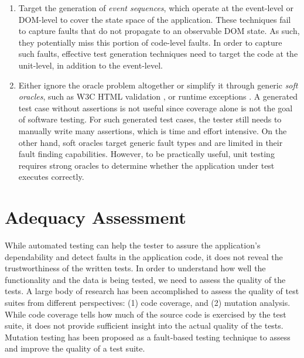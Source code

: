 \begin{enumerate} 
\item Target the generation of \emph{event sequences}, which operate at the event-level or DOM-level to cover the state space of the application. These techniques fail to capture faults that  do not propagate to an observable DOM state. As such, they potentially miss this portion of code-level \javascript faults. In order to capture such faults, effective test generation techniques need to target the code at the \javascript unit-level, in addition to the event-level.
\item Either ignore the oracle problem altogether or simplify it through generic \emph{soft oracles}, such as  W3C HTML  validation \cite{artzi:icse11,mesbah:tse12}, or  \javascript runtime exceptions \cite{artzi:icse11}.
A generated test case without assertions is not useful since coverage alone is not the goal of software testing. For such generated test cases, the tester still needs to  manually write many assertions, which is time and effort intensive. 
On the other hand, soft oracles  target generic fault types and are limited in their fault finding capabilities.   %
However, to be practically useful, unit testing requires strong oracles  to determine whether the application under test executes correctly.
\end{enumerate}

\section{Adequacy Assessment} \label{Sec:adequacy}
While automated testing can help the tester to assure the application's dependability and detect faults in the application code, it does not reveal the trustworthiness of the written tests.
In order to understand how well the functionality and the data is being tested, we need to assess the quality of the tests.
A large body of research has been accomplished to assess the quality of test suites
from different perspectives: (1) code coverage, and (2) mutation analysis.
While code coverage tells how much of the source code is exercised by the test suite, it does not provide sufficient insight into the actual quality of the tests. Mutation testing has been proposed as a fault-based testing technique to assess and improve the quality of a test suite.

